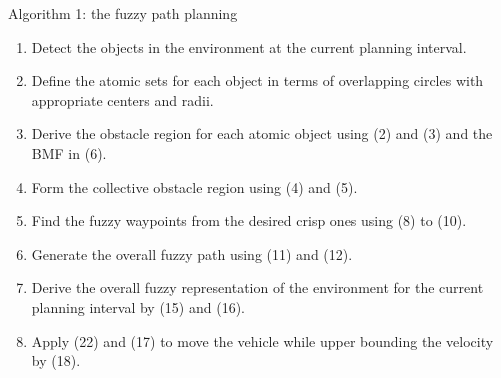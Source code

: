 \documentclass[9pt,aspectratio=169]{beamer}
\begin{document}
\begin{frame}{Algorithm 1: the fuzzy path planning}
\begin{enumerate}
  \item Detect the objects in the environment at the current planning interval.
  \item Define the atomic sets for each object in terms of overlapping circles with appropriate centers and radii.
  \item Derive the obstacle region for each atomic object using (2) and (3) and the BMF in (6).
  \item Form the collective obstacle region using (4) and (5).
  \item Find the fuzzy waypoints from the desired crisp ones using (8) to (10).
  \item Generate the overall fuzzy path using (11) and (12).
  \item Derive the overall fuzzy representation of the environment for the current planning interval by (15) and (16).
  \item Apply (22) and (17) to move the vehicle while upper bounding the velocity by (18).
\end{enumerate}
\end{frame}

\end{document}
